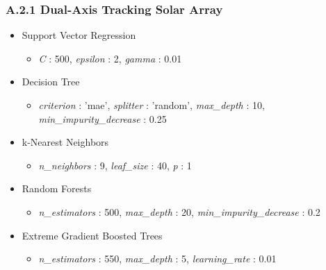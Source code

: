 \subsubsection*{A.2.1 \hspace{0.5em} Dual-Axis Tracking Solar Array}
\begin{itemize}
    \item Support Vector Regression
    \begin{itemize}
        \item \textit{C} : 500, \textit{epsilon} : 2,  \textit{gamma} : 0.01 
    \end{itemize}

    \item Decision Tree 
    \begin{itemize}
        \item \textit{criterion} : 'mae', \textit{splitter} : 'random', \textit{max\_depth} : 10, \textit{min\_impurity\_decrease} : 0.25
    \end{itemize}

    \item k-Nearest Neighbors 
    \begin{itemize}
        \item \textit{n\_neighbors} : 9, \textit{leaf\_size} : 40, \textit{p} : 1
    \end{itemize}

    \item Random Forests 
    \begin{itemize}
        \item \textit{n\_estimators} : 500, \textit{max\_depth} : 20, \textit{min\_impurity\_decrease} : 0.2
    \end{itemize}

    \item Extreme Gradient Boosted Trees
    \begin{itemize}
        \item \textit{n\_estimators} : 550, \textit{max\_depth} : 5, \textit{learning\_rate} : 0.01 
    \end{itemize}

\end{itemize}


